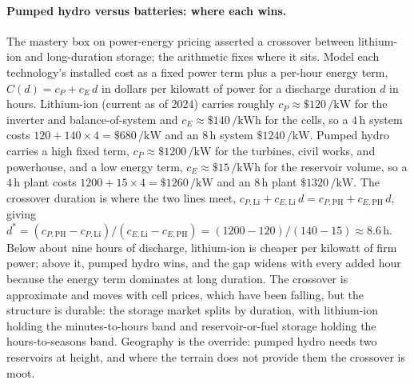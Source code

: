 \paragraph{Pumped hydro versus batteries: where each wins.} The mastery
box on power-energy pricing asserted a crossover between lithium-ion and
long-duration storage; the arithmetic fixes where it sits. Model each
technology's installed cost as a fixed power term plus a per-hour energy
term, $C(d) = c_P + c_E\, d$ in dollars per kilowatt of power for a
discharge duration $d$ in hours. Lithium-ion (current as of 2024) carries
roughly $c_P \approx \$120\,\si{\per\kilo\watt}$ for the inverter and
balance-of-system and $c_E \approx \$140\,\si{\per\kilo\watt\hour}$ for
the cells, so a $4\,\si{\hour}$ system costs $120 + 140\times4 = \$680\,
\si{\per\kilo\watt}$ and an $8\,\si{\hour}$ system $\$1240\,\si{\per\kilo
\watt}$. Pumped hydro carries a high fixed term, $c_P \approx \$1200\,
\si{\per\kilo\watt}$ for the turbines, civil works, and powerhouse, and a
low energy term, $c_E \approx \$15\,\si{\per\kilo\watt\hour}$ for the
reservoir volume, so a $4\,\si{\hour}$ plant costs $1200 + 15\times4 =
\$1260\,\si{\per\kilo\watt}$ and an $8\,\si{\hour}$ plant $\$1320\,\si{
\per\kilo\watt}$. The crossover duration is where the two lines meet,
$c_{P,\text{Li}} + c_{E,\text{Li}}\,d = c_{P,\text{PH}} +
c_{E,\text{PH}}\,d$, giving $d^\ast = (c_{P,\text{PH}} -
c_{P,\text{Li}})/(c_{E,\text{Li}} - c_{E,\text{PH}}) = (1200 - 120)/(140
- 15) \approx 8.6\,\si{\hour}$. Below about nine hours of discharge,
lithium-ion is cheaper per kilowatt of firm power; above it, pumped hydro
wins, and the gap widens with every added hour because the energy term
dominates at long duration. The crossover is approximate and moves with
cell prices, which have been falling, but the structure is durable: the
storage market splits by duration, with lithium-ion holding the
minutes-to-hours band and reservoir-or-fuel storage holding the
hours-to-seasons band. Geography is the override: pumped hydro needs two
reservoirs at height, and where the terrain does not provide them the
crossover is moot.

